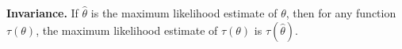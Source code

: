 \documentclass[border=3bp]{standalone}
\begin{document}
\begin{minipage}{3.5in}
\textbf{Invariance.} If $\hat{\theta}$ is the maximum likelihood estimate of
$\theta$, then for any function $\tau(\theta)$, the maximum likelihood
estimate of $\tau(\theta)$ is $\tau(\hat{\theta})$.
\end{minipage}
\end{document}
